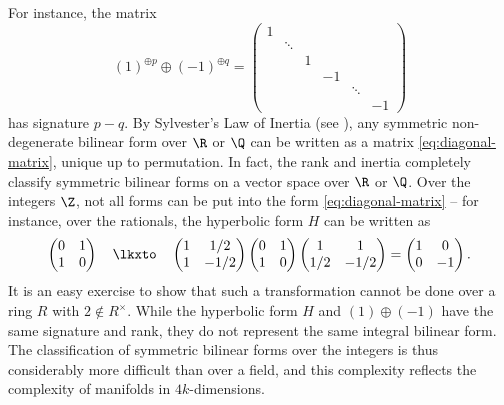 \begin{definition}
For instance, the matrix
\begin{equation}\label{eq:diagonal-matrix}
	(1)^{\oplus p}\oplus (-1)^{\oplus q} = \begin{pmatrix}
		1 &        &   &    &             \\
		  & \ddots &   &    &             \\
		  &        & 1 &    &             \\
		  &        &   & -1 &        &    \\
		  &        &   &    & \ddots &    \\
		  &        &   &    &        & -1
	\end{pmatrix}
\end{equation}
has signature $p-q$. By Sylvester's Law of Inertia (see \cite{lam2005quadratic}), any symmetric non-degenerate bilinear form over $\R$ or $\Q$ can be written as a matrix \cref{eq:diagonal-matrix}, unique up to permutation.
In fact, the rank and inertia completely classify symmetric bilinear forms on a vector space over $\R$ or $\Q$. Over the integers $\Z$, not all forms can be put into the form \cref{eq:diagonal-matrix} -- for instance, over the rationals, the hyperbolic form $H$ can be written as
\begin{equation}\label{eq:hyperbolic-form-transformation}
	\begin{pmatrix} 0 & 1\\ 1 & 0 \end{pmatrix}
	\quad\lkxto\quad
	\begin{pmatrix} 1 & 1/2 \\ 1 & -1/2 \end{pmatrix}
	\begin{pmatrix} 0 & 1 \\ 1 & 0 \end{pmatrix}
	\begin{pmatrix} 1 & 1 \\ 1/2 & -1/2 \end{pmatrix}=
	\begin{pmatrix} 1 & 0 \\ 0 & -1 \end{pmatrix}.
\end{equation}
It is an easy exercise to show that such a transformation cannot be done over a ring $R$ with $2\not\in R^\times$. While the hyperbolic form $H$ and $(1)\oplus (-1)$ have the same signature and rank, they do not represent the same integral bilinear form.
The classification of symmetric bilinear forms over the integers is thus considerably more difficult than over a field, and this complexity reflects the complexity of manifolds in $4k$-dimensions.


\end{definition}
